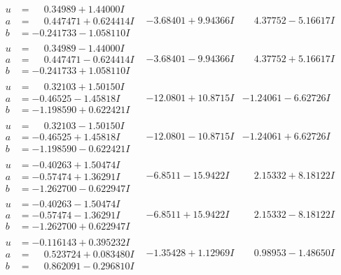 \documentclass[1p]{elsarticle_modified}
\theoremstyle{definition}
\begin{document}
$$\begin{array}{c|c|c}
\begin{aligned}
u &= \phantom{-}0.34989 + 1.44000 I \\
a &= \phantom{-}0.447471 + 0.624414 I \\
b &= -0.241733 - 1.058110 I\end{aligned}
 & -3.68401 + 9.94366 I & \phantom{-}4.37752 - 5.16617 I \\ \hline\begin{aligned}
u &= \phantom{-}0.34989 - 1.44000 I \\
a &= \phantom{-}0.447471 - 0.624414 I \\
b &= -0.241733 + 1.058110 I\end{aligned}
 & -3.68401 - 9.94366 I & \phantom{-}4.37752 + 5.16617 I \\ \hline\begin{aligned}
u &= \phantom{-}0.32103 + 1.50150 I \\
a &= -0.46525 - 1.45818 I \\
b &= -1.198590 + 0.622421 I\end{aligned}
 & -12.0801 + 10.8715 I & -1.24061 - 6.62726 I \\ \hline\begin{aligned}
u &= \phantom{-}0.32103 - 1.50150 I \\
a &= -0.46525 + 1.45818 I \\
b &= -1.198590 - 0.622421 I\end{aligned}
 & -12.0801 - 10.8715 I & -1.24061 + 6.62726 I \\ \hline\begin{aligned}
u &= -0.40263 + 1.50474 I \\
a &= -0.57474 + 1.36291 I \\
b &= -1.262700 - 0.622947 I\end{aligned}
 & -6.8511 - 15.9422 I & \phantom{-}2.15332 + 8.18122 I \\ \hline\begin{aligned}
u &= -0.40263 - 1.50474 I \\
a &= -0.57474 - 1.36291 I \\
b &= -1.262700 + 0.622947 I\end{aligned}
 & -6.8511 + 15.9422 I & \phantom{-}2.15332 - 8.18122 I \\ \hline\begin{aligned}
u &= -0.116143 + 0.395232 I \\
a &= \phantom{-}0.523724 + 0.083480 I \\
b &= \phantom{-}0.862091 - 0.296810 I\end{aligned}
 & -1.35428 + 1.12969 I & \phantom{-}0.98953 - 1.48650 I \\ \hline\begin{aligned}

\end{aligned}
\end{array}$$
\end{document}
